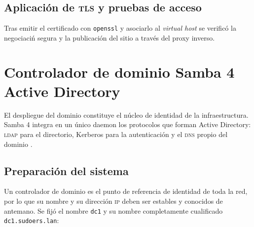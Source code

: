 \subsection{Aplicaci\'on de \textsc{tls} y pruebas de acceso}

Tras emitir el certificado con \texttt{openssl} y asociarlo al
\emph{virtual host} se verific\'o la negociaci\'n segura y la publicaci\'on
del sitio a trav\'es del proxy inverso.




\section{Controlador de dominio Samba 4 Active Directory}

El despliegue del dominio constituye el n\'ucleo de identidad de la
infraestructura. Samba 4 integra en un \'unico daemon los protocolos que
forman Active Directory: \textsc{ldap} para el directorio, Kerberos para la
autenticaci\'on y el \textsc{dns} propio del dominio
\cite{sambateam2024, rfc4511, rfc4120}.

\subsection{Preparaci\'on del sistema}

Un controlador de dominio es el punto de referencia de identidad de toda
la red, por lo que su nombre y su direcci\'on \textsc{ip} deben ser estables
y conocidos de antemano. Se fij\'o el nombre \texttt{dc1} y su nombre
completamente cualificado \texttt{dc1.sudoers.lan}:


